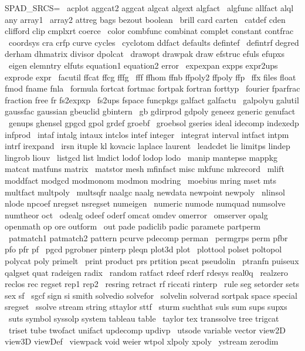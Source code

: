 \documentclass{article}
\begin{document}
SPAD_SRCS= \
     acplot aggcat2 aggcat algcat algext algfact \
     algfunc allfact alql any array1 \
     array2 attreg bags bezout boolean \
     brill card carten \
     catdef cden clifford clip cmplxrt coerce \
     color combfunc combinat complet constant contfrac \
     coordsys cra crfp curve cycles \
     cyclotom ddfact defaults defintef \
     defintrf degred derham dhmatrix divisor dpolcat \
     drawopt drawpak draw efstruc efuls efupxs \
     eigen elemntry elfuts equation1 equation2 error \
     expexpan expps expr2ups exprode expr \
     facutil ffcat ffcg fffg \
     fff ffhom ffnb ffpoly2 ffpoly ffp \
     ffx files float fmod fname fnla \
     formula fortcat fortmac fortpak fortran forttyp \
     fourier fparfrac fraction free fr fs2expxp \
     fs2ups fspace funcpkgs galfact galfactu \
     galpolyu galutil gaussfac gaussian gbeuclid gbintern \
     gb gdirprod gdpoly geneez generic genufact \
     genups ghensel gpgcd gpol grdef groebf \
     groebsol gseries ideal idecomp indexedp infprod \
     intaf intalg intaux intclos intef integer \
     integrat interval intfact intpm intrf irexpand \
     irsn ituple kl kovacic laplace laurent \
     leadcdet lie limitps lindep lingrob liouv \
     listgcd list lmdict lodof lodop lodo \
     manip mantepse mappkg matcat matfuns matrix \
     matstor mesh mfinfact misc mkfunc mkrecord \
     mlift moddfact modgcd modmonom modmon modring \
     moebius mring mset mts multfact multpoly \
     multsqfr naalgc naalg newdata newpoint newpoly \
     nlinsol nlode npcoef nregset nsregset numeigen \
     numeric numode numquad numsolve numtheor oct \
     odealg odeef oderf omcat omdev omerror \
     omserver opalg openmath op ore outform \
     out pade padiclib padic paramete partperm \
     patmatch1 patmatch2 pattern pcurve pdecomp perman \
     permgrps perm pfbr pfo pfr pf \
     pgcd pgrobner pinterp pleqn plot3d plot \
     plottool polset poltopol polycat poly primelt \
     print product prs prtition pscat pseudolin \
     ptranfn puiseux qalgset quat radeigen radix \
     random ratfact rdeef rderf rdesys real0q \
     realzero reclos rec regset rep1 rep2 \
     resring retract rf riccati rinterp \
     rule seg setorder sets sex sf \
     sgcf sign si smith solvedio solvefor \
     solvelin solverad sortpak space special sregset \
     ssolve stream string sttaylor sttf \
     sturm suchthat suls sum sups supxs \
     suts symbol syssolp system tableau table \
     taylor tex transsolve tree trigcat \
     triset tube twofact unifact updecomp updivp \
     utsode variable vector view2D view3D viewDef \
     viewpack void weier wtpol xlpoly xpoly \
     ystream zerodim
\end{document}
